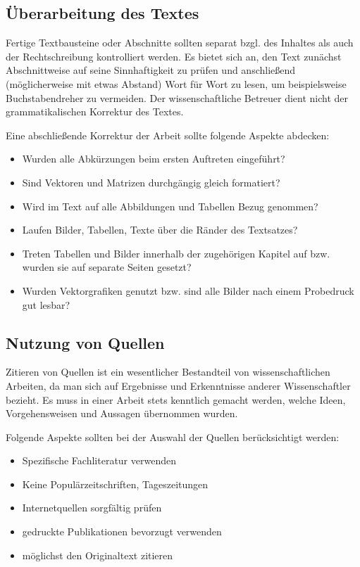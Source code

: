 \subsection{Überarbeitung des Textes}
Fertige Textbausteine oder Abschnitte sollten separat bzgl. des Inhaltes als auch der Rechtschreibung kontrolliert werden. Es bietet sich an, den Text zunächst Abschnittweise auf seine Sinnhaftigkeit zu prüfen und anschließend (möglicherweise mit etwas \glqq Abstand\grqq{}) \glqq Wort für Wort\grqq{} zu lesen, um beispielsweise Buchstabendreher zu vermeiden. Der wissenschaftliche Betreuer dient nicht der grammatikalischen Korrektur des Textes.

Eine abschließende Korrektur der Arbeit sollte folgende Aspekte abdecken:
\begin{itemize}
    \item Wurden alle Abkürzungen beim ersten Auftreten eingeführt?
    \item Sind Vektoren und Matrizen durchgängig gleich formatiert?
    \item Wird im Text auf alle Abbildungen und Tabellen Bezug genommen?
    \item Laufen Bilder, Tabellen, Texte über die Ränder des Textsatzes?
    \item Treten Tabellen und Bilder innerhalb der zugehörigen Kapitel auf bzw. wurden sie auf separate Seiten gesetzt?
    \item Wurden Vektorgrafiken genutzt bzw. sind alle Bilder nach einem Probedruck gut lesbar?
\end{itemize}

\subsection{Nutzung von Quellen}

Zitieren von Quellen ist ein wesentlicher Bestandteil von wissenschaftlichen Arbeiten, da man sich auf Ergebnisse und Erkenntnisse anderer Wissenschaftler bezieht. Es muss in einer Arbeit stets kenntlich gemacht werden, welche Ideen, Vorgehensweisen und Aussagen übernommen wurden. 

Folgende Aspekte sollten bei der Auswahl der Quellen berücksichtigt werden:
\begin{itemize}
    \item Spezifische Fachliteratur verwenden
    \item Keine Populärzeitschriften, Tageszeitungen
    \item Internetquellen sorgfältig prüfen
    \item gedruckte Publikationen bevorzugt verwenden
    \item möglichst den Originaltext zitieren
\end{itemize}


